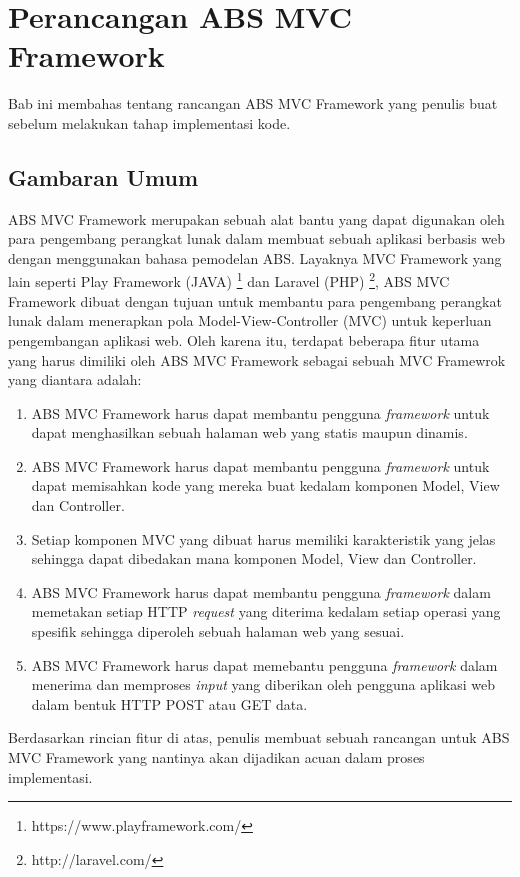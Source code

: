 \chapter{Perancangan ABS MVC Framework}

Bab ini membahas tentang rancangan ABS MVC Framework yang penulis buat sebelum melakukan tahap implementasi kode.

\section{Gambaran Umum}

ABS MVC Framework merupakan sebuah alat bantu yang dapat digunakan oleh para pengembang perangkat lunak dalam membuat sebuah aplikasi berbasis web dengan menggunakan bahasa pemodelan ABS. Layaknya MVC Framework yang lain seperti Play Framework (JAVA) \footnote{https://www.playframework.com/} dan Laravel (PHP) \footnote{http://laravel.com/}, ABS MVC Framework dibuat dengan tujuan untuk membantu para pengembang perangkat lunak dalam menerapkan pola Model-View-Controller (MVC) untuk keperluan pengembangan aplikasi web. Oleh karena itu, terdapat beberapa fitur utama yang harus dimiliki oleh ABS MVC Framework sebagai sebuah MVC Framewrok yang diantara adalah:

\begin{enumerate}
    \item ABS MVC Framework harus dapat membantu pengguna \textit{framework} untuk dapat menghasilkan sebuah halaman web yang statis maupun dinamis.
    \item ABS MVC Framework harus dapat membantu pengguna \textit{framework} untuk dapat memisahkan kode yang mereka buat kedalam komponen Model, View dan Controller.
    \item Setiap komponen MVC yang dibuat harus memiliki karakteristik yang jelas sehingga dapat dibedakan mana komponen Model, View dan Controller.
    \item ABS MVC Framework harus dapat membantu pengguna \textit{framework} dalam memetakan setiap HTTP \textit{request} yang diterima kedalam setiap operasi yang spesifik sehingga diperoleh sebuah halaman web yang sesuai.
    \item ABS MVC Framework harus dapat memebantu pengguna \textit{framework} dalam menerima dan memproses \textit{input} yang diberikan oleh pengguna aplikasi web dalam bentuk HTTP POST atau GET data. 
\end{enumerate}

Berdasarkan rincian fitur di atas, penulis membuat sebuah rancangan untuk ABS MVC Framework yang nantinya akan dijadikan acuan dalam proses implementasi.

